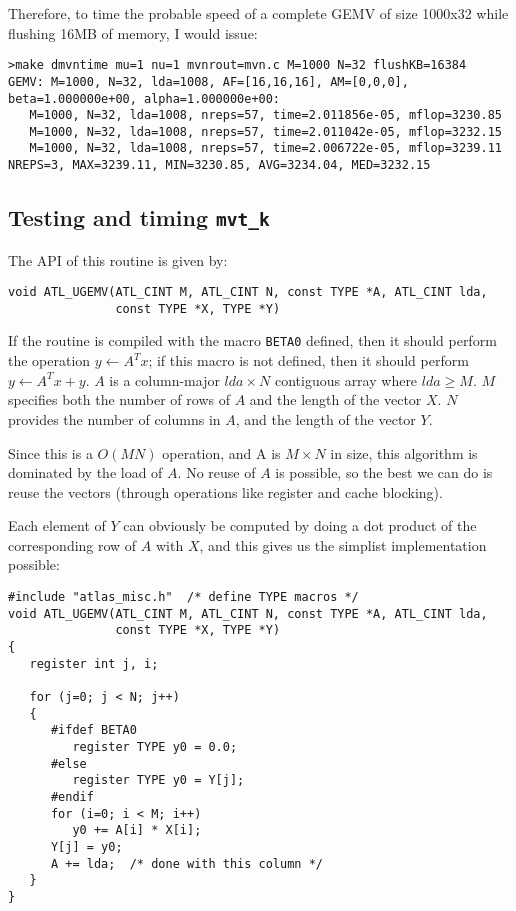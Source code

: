 \documentclass[11pt]{article}
\newcommand{\kernk}[1]{{\tt #1\_k}}
\begin{document}
Therefore, to time the probable speed of a complete GEMV of size 1000x32 
while flushing 16MB of memory, I would issue:
\begin{verbatim}
>make dmvntime mu=1 nu=1 mvnrout=mvn.c M=1000 N=32 flushKB=16384
GEMV: M=1000, N=32, lda=1008, AF=[16,16,16], AM=[0,0,0], beta=1.000000e+00, alpha=1.000000e+00:
   M=1000, N=32, lda=1008, nreps=57, time=2.011856e-05, mflop=3230.85
   M=1000, N=32, lda=1008, nreps=57, time=2.011042e-05, mflop=3232.15
   M=1000, N=32, lda=1008, nreps=57, time=2.006722e-05, mflop=3239.11
NREPS=3, MAX=3239.11, MIN=3230.85, AVG=3234.04, MED=3232.15
\end{verbatim}

\subsection{Testing and timing \kernk{mvt}}
The API of this routine is given by:
\begin{verbatim}
void ATL_UGEMV(ATL_CINT M, ATL_CINT N, const TYPE *A, ATL_CINT lda,
               const TYPE *X, TYPE *Y)
\end{verbatim}
If the routine is compiled with the macro {\tt BETA0} defined, then
it should perform the operation $y \leftarrow A^Tx$; if this macro is
not defined, then it should perform $y \leftarrow A^Tx + y$.
$A$ is a column-major $lda \times N$ contiguous array where $lda \ge M$.
$M$ specifies both the number of rows of $A$ and the length of the vector $X$.
$N$ provides the number of columns in $A$, and the length of the vector $Y$.

Since this is a $O(MN)$ operation, and A is $M \times N$ in size,
this algorithm is dominated by the load of $A$.  No reuse of $A$ is
possible, so the best we can do is reuse the vectors (through operations
like register and cache blocking).

Each element of $Y$ can obviously be computed by doing a dot product of
the corresponding row of $A$ with $X$, and this gives us the simplist
implementation possible:
\begin{verbatim}
#include "atlas_misc.h"  /* define TYPE macros */
void ATL_UGEMV(ATL_CINT M, ATL_CINT N, const TYPE *A, ATL_CINT lda,
               const TYPE *X, TYPE *Y)
{
   register int j, i;
   
   for (j=0; j < N; j++)
   {
      #ifdef BETA0
         register TYPE y0 = 0.0;
      #else
         register TYPE y0 = Y[j];
      #endif
      for (i=0; i < M; i++)
         y0 += A[i] * X[i];
      Y[j] = y0;
      A += lda;  /* done with this column */
   }
}
\end{verbatim}
\end{document}
